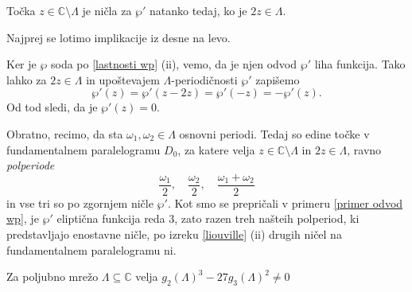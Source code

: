 \documentclass[mat1]{fmfdelo}
\numberwithin{equation}{section}
\newcommand{\C}{\mathbb C}
\newcommand{\om}{\omega}
\theoremstyle{definition}
\begin{document}
%
%
\begin{lema}
    \label{polperiode so nicle odvoda wp}
    Točka $z \in \C\setminus\Lambda$ je ničla za $\wp'$ natanko tedaj, ko je $2z \in \Lambda$.
\end{lema}

\begin{dokaz}
    Najprej se lotimo implikacije iz desne na levo.

    Ker je $\wp$ soda po \ref{lastnosti wp} (ii), vemo, da je njen odvod $\wp'$ liha funkcija. Tako lahko za $2z\in \Lambda$ in upoštevajem $\Lambda$-periodičnosti $\wp'$ zapišemo
    \[
        \wp'(z) = \wp'(z - 2z) = \wp'(-z) = -\wp'(z).
    \]
    Od tod sledi, da je $\wp'(z) = 0$.

    Obratno, recimo, da sta $\om_1, \om_2 \in \Lambda$ osnovni periodi. Tedaj so edine točke v fundamentalnem paralelogramu $D_0$, za katere velja $z \in \C\setminus\Lambda$ in $2z\in\Lambda$, ravno \emph{polperiode}
    \[
        \frac{\om_1}{2}, \quad \frac{\om_2}{2}, \quad \frac{\om_1 + \om_2}{2} 
    \]
    in vse tri so po zgornjem ničle $\wp'$. Kot smo se prepričali v primeru \ref{primer odvod wp}, je $\wp'$ eliptična funkcija reda $3$, zato razen treh našteih polperiod, ki predstavljajo enostavne ničle, po izreku \ref{liouville} (ii) drugih ničel na fundamentalnem paralelogramu ni.   
\end{dokaz}

\begin{lema}
    Za poljubno mrežo $\Lambda \subseteq \C$ velja $g_2(\Lambda)^3 - 27g_3(\Lambda)^2 \neq 0$
\end{lema}
\end{document}

